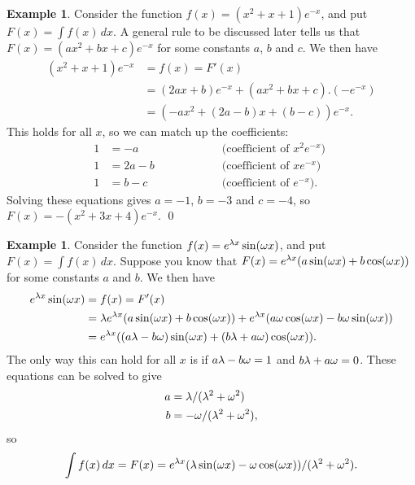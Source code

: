 \documentclass[a4paper]{book}
\theoremstyle{definition}
\newtheorem{example}[theorem]{Example}
\begin{document}
\begin{example}
 Consider the function $f(x)=(x^2+x+1)e^{-x}$, and put
  $F(x)=\int f(x)\,dx$.  A general rule to be discussed later tells us
 that $F(x)=(ax^2+bx+c)e^{-x}$ for some constants $a$, $b$ and $c$.
 We then have
 \begin{align*}
  (x^2+x+1)e^{-x} &= f(x) = F'(x) \\
    &= (2ax+b) e^{-x} + (ax^2+bx+c).(-e^{-x}) \\
    &= (-ax^2+(2a-b)x+(b-c)) e^{-x}.
 \end{align*}
 This holds for all $x$, so we can match up the coefficients:
 \[ \begin{array}{rlcl}
  1 &= -a   &\hspace{4em}& \text{ (coefficient of $x^2e^{-x}$) } \\
  1 &= 2a-b &            & \text{ (coefficient of $xe^{-x}$) } \\
  1 &= b-c  &            & \text{ (coefficient of $e^{-x}$). }
 \end{array} \]
 Solving these equations gives $a=-1$, $b=-3$ and $c=-4$, so 
 $F(x)=-(x^2+3x+4)e^{-x}$.  \qed
\end{example}
\begin{example}
 Consider the function $f(x)=e^{\lambda x}\sin(\omega x)$, and put
 $F(x)=\int f(x)\,dx$.  Suppose you know that
 $F(x)=e^{\lambda x}(a\sin(\omega x)+b\cos(\omega x))$ for some constants $a$
 and $b$.  We then have
 \begin{align*}
  e^{\lambda x}\sin(\omega x) &= f(x) = F'(x) \\
   &= \lambda e^{\lambda x}(a\sin(\omega x)+b\cos(\omega x)) +
      e^{\lambda x}(a\omega\cos(\omega x)-b\omega\sin(\omega x)) \\
   &= e^{\lambda x}((a\lambda-b\omega)\sin(\omega x) + 
                (b\lambda+a\omega)\cos(\omega x)).
 \end{align*}
 The only way this can hold for all $x$ is if $a\lambda-b\omega=1$ and
 $b\lambda+a\omega=0$.  These equations can be solved to give
 \begin{align*}
  a &= \lambda/(\lambda^2+\omega^2) \\
  b &= -\omega/(\lambda^2+\omega^2),
 \end{align*}
 so 
 \[ \int f(x)\, dx = F(x) = 
     e^{\lambda x}(\lambda\sin(\omega x) - \omega\cos(\omega x))/(\lambda^2+\omega^2).
 \]
\end{example}
\end{document}
